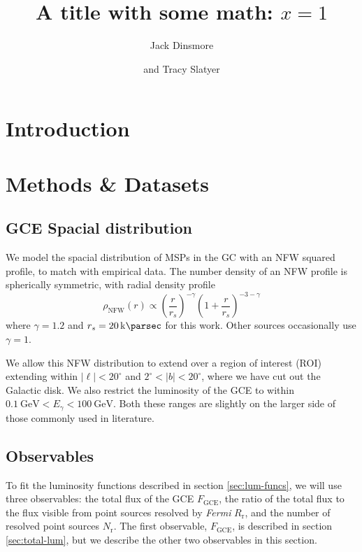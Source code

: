 \documentclass[a4paper,11pt]{article}
\title{\boldmath A title with some math: $x=1$}
\author{Jack Dinsmore}
\author{and Tracy Slatyer}
\affiliation{Massachusetts Institute of Technology \\Cambridge, MA, USA}
\newcommand{\parens}[1]{\left(#1\right)}
\begin{document}
\maketitle
\flushbottom



\section{Introduction}



\section{Methods \& Datasets}
\subsection{GCE Spacial distribution}
We model the spacial distribution of MSPs in the GC with an NFW squared profile, to match with empirical data. The number density of an NFW profile is spherically symmetric, with radial density profile
\label{sec:spacial-distro}
\begin{equation}
    \rho_\text{NFW}(r) \propto \parens{\frac{r}{r_s}}^{-\gamma}\parens{1 + \frac{r}{r_s}}^{-3-\gamma}
    \label{eqn:nfw}
\end{equation}
where $\gamma = 1.2$ and $r_s = \SI{20}{\kilo\parsec}$ for this work. Other sources occasionally use $\gamma = 1$.

We allow this NFW distribution to extend over a region of interest (ROI) extending within $|\ell| < 20^\circ$ and $2^\circ < |b| < 20^\circ$, where we have cut out the Galactic disk. We also restrict the luminosity of the GCE to within $\SI{0.1}{\giga\electronvolt} < E_\gamma < \SI{100}{\giga\electronvolt}$. Both these ranges are slightly on the larger side of those commonly used in literature.


\subsection{Observables}
\label{sec:observables}
To fit the luminosity functions described in section \ref{sec:lum-funcs}, we will use three observables: the total flux of the GCE $F_\text{GCE}$, the ratio of the total flux to the flux visible from point sources resolved by \textit{Fermi} $R_\text{r}$, and the number of resolved point sources $N_\text{r}$. The first observable, $F_\text{GCE}$, is described in section \ref{sec:total-lum}, but we describe the other two observables in this section.
\end{document}
